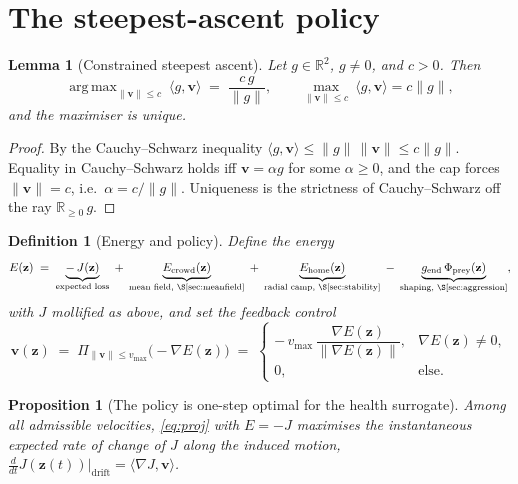\documentclass[11pt]{article}
\newtheorem{lemma}[theorem]{Lemma}
\newtheorem{proposition}[theorem]{Proposition}
\newtheorem{definition}[theorem]{Definition}
\newcommand{\R}{\mathbb{R}}
\newcommand{\vmax}{v_{\max}}
\newcommand{\z}{\mathbf{z}}
\newcommand{\vv}{\mathbf{v}}
\DeclareMathOperator*{\argmax}{arg\,max}
\begin{document}
\newpage
\section{The steepest-ascent policy}\label{sec:policy}

\begin{lemma}[Constrained steepest ascent]\label{lem:steepest}
Let $g\in\R^2$, $g\ne 0$, and $c>0$. Then
\[
  \argmax_{\|\vv\|\le c}\ \langle g,\vv\rangle \;=\; \frac{c\,g}{\|g\|},
  \qquad \max_{\|\vv\|\le c}\ \langle g,\vv\rangle = c\|g\|,
\]
and the maximiser is unique.
\end{lemma}

\begin{proof}
By the Cauchy--Schwarz inequality $\langle g,\vv\rangle\le\|g\|\,\|\vv\|\le c\|g\|$.
Equality in Cauchy--Schwarz holds iff $\vv=\alpha g$ for some $\alpha\ge 0$, and
the cap forces $\|\vv\|=c$, i.e.\ $\alpha=c/\|g\|$. Uniqueness is the strictness
of Cauchy--Schwarz off the ray $\R_{\ge0}\,g$.
\end{proof}

\begin{definition}[Energy and policy]\label{def:policy}
Define the energy
\begin{equation}\label{eq:energy}
  E(\z) \;=\; \underbrace{-\,J(\z)}_{\text{expected loss}}
  \;+\; \underbrace{E_{\mathrm{crowd}}(\z)}_{\text{mean field, \S\ref{sec:meanfield}}}
  \;+\; \underbrace{E_{\mathrm{home}}(\z)}_{\text{radial camp, \S\ref{sec:stability}}}
  \;-\; \underbrace{g_{\mathrm{end}}\,\Phi_{\mathrm{prey}}(\z)}_{\text{shaping, \S\ref{sec:aggression}}},
\end{equation}
with $J$ mollified as above, and set the feedback control
\begin{equation}\label{eq:proj}
  \vv(\z)\;=\;\Pi_{\|\vv\|\le\vmax}\!\big(-\nabla E(\z)\big)
  \;=\;\begin{cases} -\,\vmax\,\dfrac{\nabla E(\z)}{\|\nabla E(\z)\|}, & \nabla E(\z)\ne 0,\\[4pt] 0,&\text{else.}\end{cases}
\end{equation}
\end{definition}

\begin{proposition}[The policy is one-step optimal for the health surrogate]
\label{prop:greedy}
Among all admissible velocities, \eqref{eq:proj} with $E=-J$ maximises the
instantaneous expected rate of change of $J$ along the induced motion,
$\frac{d}{dt}J(\z(t))\big|_{\text{drift}}=\langle\nabla J,\vv\rangle$.
\end{proposition}
\end{document}
